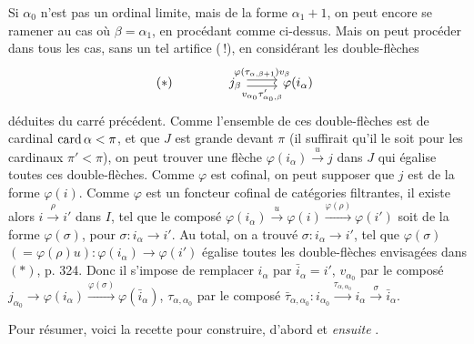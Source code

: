 Si $\alpha_0$ n'est pas un ordinal limite, mais de la forme $\alpha_1+1$, on peut encore se ramener au cas où $\beta=\alpha_1$, en procédant comme ci-dessus. Mais on peut procéder dans tous les cas, sans un tel artifice (\,!), en considérant les double-flèches
\[
(*)\qquad\qquad
\begin{tikzcd}
j_\beta \arrow[r, shift left, "\varphi(\tau_{\alpha,\beta+1})v_\beta"] \arrow[r, shift right, "v_{\alpha_0}\tau'_{\alpha_0,\beta}"'] & \varphi(i_\alpha)
\end{tikzcd}
\]
déduites du carré précédent. Comme
l'ensemble de ces double-flèches est de cardinal $\operatorname{card}\alpha<\pi$, et que $J$ est grande devant $\pi$ (il suffirait qu'il le soit pour les cardinaux $\pi'<\pi$), on peut trouver une flèche $\varphi(i_\alpha)\xrightarrow{u}j$ dans $J$ qui égalise toutes ces double-flèches. Comme $\varphi$ est cofinal, on peut supposer que $j$ est de la forme $\varphi(i)$. Comme $\varphi$ est un foncteur cofinal de catégories filtrantes, il existe alors $i\xrightarrow{\rho}i'$ dans $I$, tel que le composé $\varphi(i_\alpha)\xrightarrow{u}\varphi(i)\xrightarrow{\varphi(\rho)}\varphi(i')$ soit de la forme $\varphi(\sigma)$, pour $\sigma:i_\alpha\longrightarrow i'$. Au total, on a trouvé $\sigma:i_\alpha\longrightarrow i'$, tel que $\varphi(\sigma)$ $(=\varphi(\rho)u):\varphi(i_\alpha)\longrightarrow\varphi(i')$ égalise toutes les double-flèches envisagées dans $(*)$, p. 324. Donc il s'impose de remplacer $i_\alpha$ par $\bar{i}_\alpha=i'$, $v_{\alpha_0}$ par le composé $j_{\alpha_0}\longrightarrow\varphi(i_\alpha)\xrightarrow{\varphi(\sigma)}\varphi(\bar{i}_\alpha)$, $\tau_{\alpha,\alpha_0}$
par le composé $\bar{\tau}_{\alpha,\alpha_0}:i_{\alpha_0}\xrightarrow{\tau_{\alpha,\alpha_0}}i_\alpha\xrightarrow{\sigma}\bar{i}_\alpha$.

Pour résumer, voici la recette pour construire, d'abord et \textit{ensuite} .


